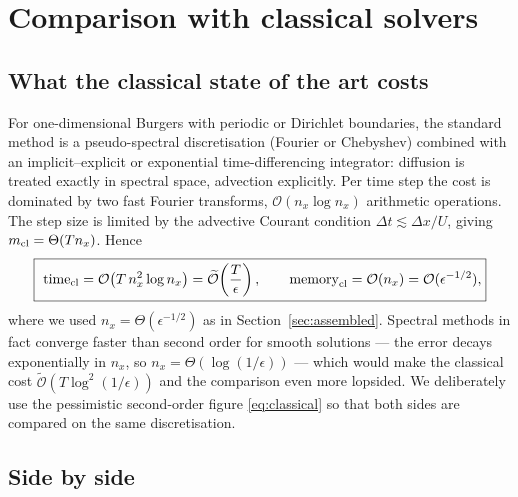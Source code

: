 \documentclass[11pt,a4paper]{article}
\theoremstyle{plain}
\theoremstyle{definition}
\theoremstyle{remark}
\newcommand{\Oh}{\mathcal{O}}
\newcommand{\Ot}{\widetilde{\mathcal{O}}}
\begin{document}
\section{Comparison with classical solvers}
\label{sec:classical}

\subsection{What the classical state of the art costs}

For one-dimensional Burgers with periodic or Dirichlet boundaries, the standard
method is a pseudo-spectral discretisation (Fourier or Chebyshev) combined with
an implicit--explicit or exponential time-differencing integrator: diffusion is
treated exactly in spectral space, advection explicitly.  Per time step the cost
is dominated by two fast Fourier transforms, $\Oh(n_x\log n_x)$ arithmetic
operations.  The step size is limited by the advective Courant condition
$\Delta t\lesssim\Delta x/U$, giving $m_{\rm cl}=\Theta(Tn_x)$.  Hence
\begin{equation}
\boxed{\
\text{time}_{\rm cl}=\Oh\!\left(T\,n_x^{2}\log n_x\right)
=\Ot\!\left(\frac{T}{\epsilon}\right),
\qquad
\text{memory}_{\rm cl}=\Oh(n_x)=\Oh(\epsilon^{-1/2}),}
\label{eq:classical}
\end{equation}
where we used $n_x=\Theta(\epsilon^{-1/2})$ as in Section~\ref{sec:assembled}.
Spectral methods in fact converge faster than second order for smooth solutions
--- the error decays exponentially in $n_x$, so $n_x=\Theta(\log(1/\epsilon))$
--- which would make the classical cost $\Ot(T\log^2(1/\epsilon))$ and the
comparison even more lopsided.  We deliberately use the pessimistic
second-order figure \eqref{eq:classical} so that both sides are compared on the
same discretisation.

\subsection{Side by side}
\end{document}
